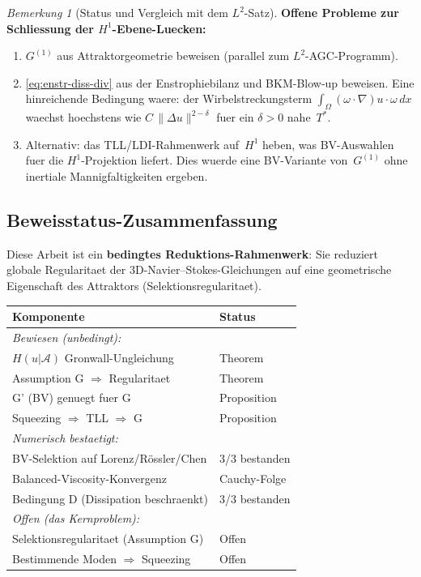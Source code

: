 \documentclass[12pt,a4paper]{article}
\theoremstyle{definition}
\theoremstyle{plain}
\theoremstyle{remark}
\newtheorem{remark}[definition]{Bemerkung}
\begin{document}
\begin{remark}[Status und Vergleich mit dem $L^2$-Satz]
\medskip\noindent
\textbf{Offene Probleme zur Schliessung der $H^1$-Ebene-Luecken:}
\begin{enumerate}
  \item $G^{(1)}$ aus Attraktorgeometrie beweisen (parallel zum
    $L^2$-AGC-Programm).
  \item \eqref{eq:enstr-diss-div} aus der Enstrophiebilanz
    und BKM-Blow-up beweisen. Eine hinreichende Bedingung waere: der Wirbelstreckungsterm $\int_\Omega(\omega\cdot\nabla)u\cdot\omega\,dx$
    waechst hoechstens wie $C\,\|\Delta u\|^{2-\delta}$ fuer ein
    $\delta > 0$ nahe~$T^*$.
  \item Alternativ: das TLL/LDI-Rahmenwerk auf~$H^1$ heben,
    was BV-Auswahlen fuer die $H^1$-Projektion liefert. Dies wuerde
    eine BV-Variante von~$G^{(1)}$ ohne inertiale Mannigfaltigkeiten ergeben.
\end{enumerate}
\end{remark}


\subsection*{Beweisstatus-Zusammenfassung}

Diese Arbeit ist ein \textbf{bedingtes Reduktions-Rahmenwerk}: Sie reduziert globale Regularitaet der 3D-Navier--Stokes-Gleichungen auf eine geometrische Eigenschaft des Attraktors (Selektionsregularitaet).

\begin{center}
\begin{tabular}{|l|l|}
\hline
\textbf{Komponente} & \textbf{Status} \\
\hline
\hline
\multicolumn{2}{|l|}{\textit{Bewiesen (unbedingt):}} \\
\hline
$H(u|\mathcal{A})$ Gronwall-Ungleichung & Theorem \\
Assumption G $\Rightarrow$ Regularitaet & Theorem \\
G' (BV) genuegt fuer G & Proposition \\
Squeezing $\Rightarrow$ TLL $\Rightarrow$ G & Proposition \\
\hline
\multicolumn{2}{|l|}{\textit{Numerisch bestaetigt:}} \\
\hline
BV-Selektion auf Lorenz/R\"ossler/Chen & 3/3 bestanden \\
Balanced-Viscosity-Konvergenz & Cauchy-Folge \\
Bedingung D (Dissipation beschraenkt) & 3/3 bestanden \\
\hline
\multicolumn{2}{|l|}{\textit{Offen (das Kernproblem):}} \\
\hline
Selektionsregularitaet (Assumption G) & Offen \\
Bestimmende Moden $\Rightarrow$ Squeezing & Offen \\
\hline
\end{tabular}
\end{center}
\end{document}
